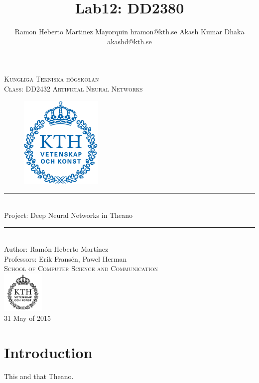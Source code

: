 \documentclass[11pt,a4paper]{article}
\title{Lab12: DD2380 }
\author{
Ramon Heberto Martinez Mayorquin  hramon@kth.se 
Akash Kumar Dhaka  akashd@kth.se 
}
\newcommand{\HRule}{\rule{\linewidth}{0.5mm}}
\begin{document}
\begin{titlepage}
\begin{center}

\textsc{\LARGE Kungliga Tekniska högskolan}\\[1.0cm]

\textsc{\Large Class: DD2432 Artificial Neural Networks}\\[2.0cm]



\begin{figure}[H]
	\centering
 \includegraphics[width=0.35\textwidth]{Kth_logo.png}
\end{figure}


\HRule \\[0.4cm]
{ \huge  Project: Deep Neural Networks in Theano
}\\[0.4cm]
\HRule \\[1.5cm]


Author: Ram\'on Heberto Mart\'inez \\ 
\large Professors: Erik Frans\'en, Pawel Herman  \\ [2.5cm]

\textsc{\Large School of Computer Science and Communication }\\ [1.0cm] 
\includegraphics[width=0.15\textwidth]{KTH_black.png}\\[1.5cm] %
{\large 31 May of 2015}

\end{center}
\end{titlepage}

\section{Introduction}

This and that Theano. 
\end{document}
